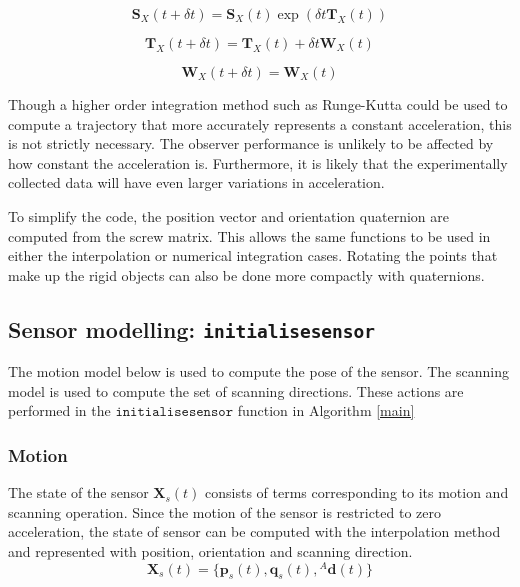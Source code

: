 \begin{equation}
	\mathbf{S}_X(t+\delta t) = \mathbf{S}_X(t)\exp({\delta t {\mathbf{T}_X(t)}})
\end{equation}

\begin{equation}
	\mathbf{T}_X(t+\delta t) = \mathbf{T}_X(t) + \delta t \mathbf{W}_X(t)
\end{equation}

\begin{equation}
	\mathbf{W}_X(t+\delta t) =\mathbf{W}_X(t)
\end{equation}

Though a higher order integration method such as Runge-Kutta could be used to compute a trajectory that more accurately represents a constant acceleration, this is not strictly necessary. The observer performance is unlikely to be affected by how constant the acceleration is. Furthermore, it is likely that the experimentally collected data will have even larger variations in acceleration.

To simplify the code, the position vector and orientation quaternion are computed from the screw matrix. This allows the same functions to be used in either the interpolation or numerical integration cases. Rotating the points that make up the rigid objects can also be done more compactly with quaternions.

\subsection{Sensor modelling: \texttt{initialisesensor}}
The motion model below is used to compute the pose of the sensor. The scanning model is used to compute the set of scanning directions. These actions are performed in the $\texttt{initialisesensor}$ function in Algorithm \ref{main}
\subsubsection{Motion}
The state of the sensor $\mathbf{X}_{s}(t)$ consists of terms corresponding to its motion and scanning operation. Since the motion of the sensor is restricted to zero acceleration, the state of sensor can be computed with the interpolation method and represented with position, orientation and scanning direction. 
\begin{equation}
	\mathbf{X}_{s}(t) = \{\mathbf{p}_s(t),\mathbf{q}_s(t),{^{A}\mathbf{d}(t)}\}
\end{equation}

